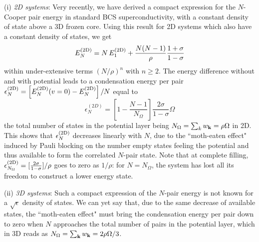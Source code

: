 \documentclass[5p,twocolumn]{elsarticle}
\begin{document}
(i) {\it 2D systems}: Very recently\cite{moth}, we have derived a compact expression for the $N$-Cooper pair energy in standard BCS superconductivity, with a constant density of state above a 3D frozen core. Using this result  for 2D systems which also have a constant density of states, we get
\begin{equation}\label{eq:E2dN}
 E^{{\text{(2D)}}}_N=N\,E^{{\text{(2D)}}}_1+\frac{N(N-1)}{\rho}\frac{1+\sigma}{1-\sigma}
\end{equation}
within under-extensive terms $(N/\rho)^n$ with $n\geqslant2$.
The energy difference without and with potential
leads to a condensation energy per pair $\epsilon_N^{{\text{(2D)}}} = \left[E_N^{{{\text{(2D)}}}}(v=0)-E_N^{{\text{(2D)}}}\right]/N$ equal to
  \begin{equation}
\epsilon^{(2D)}_N=\left[1-\frac{N-1}{N_\Omega}\right]\frac{2\sigma}{1-\sigma}\Omega\label{eq:E2D}
\end{equation}
 the total number of states in the potential layer being $N_\Omega=\sum_k{}w_{\mathbf{k}}=\rho\Omega$ in 2D. This shows that $\epsilon^{{\text{(2D)}}}_N$  decreases linearly with $N$, due to the ``moth-eaten effect" induced by Pauli blocking on the number empty states feeling the potential and thus available to form the correlated $N$-pair state.  Note that at complete filling, $
\epsilon^{{\text{(2D)}}}_{N_\Omega}=[\frac{2\sigma}{1-\sigma}]/\rho$ goes to zero as $1/\rho$: for $N=N_\Omega$, the system has lost all its freedom to construct a lower energy state.






(ii) {\it 3D systems}: Such a compact expression of the $N$-pair energy is not known for a $\sqrt{\epsilon}$ density of states. We can yet say that, due to the same decrease of available states, the ``moth-eaten effect" must bring the condensation energy per pair down to zero when $N$ approaches the total number of pairs in the potential layer, which in 3D reads as $N_\Omega=\sum_{\mathbf{k}}w_{\mathbf{k}}=2\rho \Omega/3$. 
\end{document}
